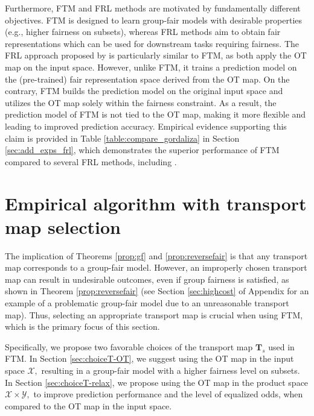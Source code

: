 \documentclass[10pt]{article} %
\begin{document}
Furthermore, FTM and FRL methods are motivated by fundamentally different objectives.
FTM is designed to learn group-fair models with desirable properties (e.g., higher fairness on subsets), whereas FRL methods aim to obtain fair representations which can be used for downstream tasks requiring fairness.
The FRL approach proposed by \citet{pmlr-v97-gordaliza19a} is particularly similar to FTM, as both apply the OT map on the input space. 
However, unlike FTM, it trains a prediction model on the (pre-trained) fair representation space derived from the OT map.
On the contrary, FTM builds the prediction model on the original input space and utilizes the OT map solely within the fairness constraint.
As a result, the prediction model of FTM is not tied to the OT map, making it more flexible and leading to improved prediction accuracy.
Empirical evidence supporting this claim is provided in Table \ref{table:compare_gordaliza} in Section \ref{sec:add_exps_frl}, which demonstrates the superior performance of FTM compared to several FRL methods, including \citet{pmlr-v97-gordaliza19a}.


\section{Empirical algorithm with transport map selection}\label{sec:choiceT}

The implication of Theorems \ref{prop:gf} and \ref{prop:reversefair} is that any transport map corresponds to a group-fair model.
However, an improperly chosen transport map can result in undesirable outcomes, even if group fairness is satisfied, as shown in Theorem \ref{prop:reversefair} (see Section \ref{sec:highcost} of Appendix for an example of a problematic group-fair model due to an unreasonable transport map).
Thus, selecting an appropriate transport map is crucial when using FTM, which is the primary focus of this section.

Specifically, we propose two favorable choices of the transport map $\mathbf{T}_{s}$ used in FTM.
In Section \ref{sec:choiceT-OT}, we suggest using the OT map in the input space $\mathcal{X},$ resulting in a group-fair model with a higher fairness level on subsets.
In Section \ref{sec:choiceT-relax}, we propose using the OT map in the product space $\mathcal{X} \times \mathcal{Y},$ to improve prediction performance and the level of equalized odds, when compared to the OT map in the input space.
\end{document}
